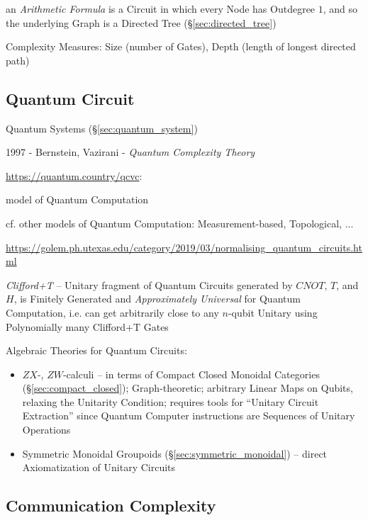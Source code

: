 an \emph{Arithmetic Formula} is a Circuit in which every Node has Outdegree $1$,
and so the underlying Graph is a Directed Tree (\S\ref{sec:directed_tree})

Complexity Measures: Size (number of Gates), Depth (length of longest directed
path)



\subsection{Quantum Circuit}\label{sec:quantum_circuit}

\fist Quantum Systems (\S\ref{sec:quantum_system})

1997 - Bernstein, Vazirani - \emph{Quantum Complexity Theory}

\url{https://quantum.country/qcvc}:

model of Quantum Computation

cf. other models of Quantum Computation: Measurement-based, Topological, ...

\url{https://golem.ph.utexas.edu/category/2019/03/normalising_quantum_circuits.html}

\emph{Clifford+T} -- Unitary fragment of Quantum Circuits generated by $CNOT$,
$T$, and $H$, is Finitely Generated and \emph{Approximately Universal} for
Quantum Computation, i.e. can get arbitrarily close to any $n$-qubit Unitary
using Polynomially many Clifford+T Gates

Algebraic Theories for Quantum Circuits:
\begin{itemize}
  \item $ZX$-, $ZW$-calculi -- in terms of Compact Closed Monoidal Categories
    (\S\ref{sec:compact_closed}); Graph-theoretic; arbitrary Linear Maps on
    Qubits, relaxing the Unitarity Condition; requires tools for ``Unitary
    Circuit Extraction'' since Quantum Computer instructions are Sequences of
    Unitary Operations
  \item Symmetric Monoidal Groupoids (\S\ref{sec:symmetric_monoidal}) -- direct
    Axiomatization of Unitary Circuits
\end{itemize}



\subsection{Communication Complexity}\label{sec:communication_complexity}

